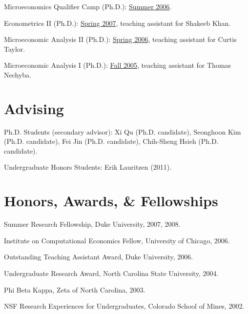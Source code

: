 \documentclass[10pt,letterpaper]{article}
\renewenvironment{itemize}{
  \begin{list}{}{
    \setlength{\leftmargin}{1.5em}
    \setlength{\itemsep}{0.25em}
    \setlength{\parskip}{0pt}
    \setlength{\parsep}{0.25em}
  }
}{
  \end{list}
}
\begin{document}
\begin{itemize}
\item Microeconomics Qualifier Camp (Ph.D.):
  \href{http://jblevins.org/courses/qualcamp06/}{Summer 2006}.
\item Econometrics II (Ph.D.):
  \href{http://jblevins.org/courses/econ342s07/}{Spring 2007}, teaching assistant for Shakeeb Khan.
\item Microeconomic Analysis II (Ph.D.):
  \href{http://jblevins.org/courses/econ302s06/}{Spring 2006}, teaching assistant for Curtis Taylor.
\item Microeconomic Analysis I (Ph.D.):
  \href{http://jblevins.org/courses/econ301f05/}{Fall 2005}, teaching assistant for Thomas Nechyba.
\end{itemize}

\section*{Advising}

\begin{itemize}
\item Ph.D. Students (secondary advisor):
  Xi Qu (Ph.D. candidate),            %
  Seonghoon Kim (Ph.D. candidate),    %
  Fei Jin (Ph.D. candidate),          %
  Chih-Sheng Hsieh (Ph.D. candidate). %

\item Undergraduate Honors Students:
  Erik Lauritzen (2011).              %
\end{itemize}

\section*{Honors, Awards, \& Fellowships}

\begin{itemize}
\item Summer Research Fellowship, Duke University, 2007, 2008.
\item Institute on Computational Economics Fellow, University of Chicago, 2006.
\item Outstanding Teaching Assistant Award, Duke University, 2006.
\item Undergraduate Research Award, North Carolina State University, 2004.
\item Phi Beta Kappa, Zeta of North Carolina, 2003.
\item NSF Research Experiences for Undergraduates, Colorado School of Mines, 2002.
\end{itemize}
\end{document}
